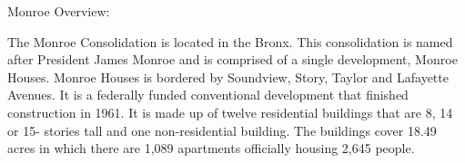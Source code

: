 Monroe Overview:    

  

The Monroe Consolidation is located in the Bronx. This consolidation is named after President James Monroe and is comprised of a single development, Monroe Houses. Monroe Houses is bordered by Soundview, Story, Taylor and Lafayette Avenues. It is a federally funded conventional development that finished construction in 1961. It is made up of twelve residential buildings that are 8, 14 or 15- stories tall and one non-residential building. The buildings cover 18.49 acres in which there are 1,089 apartments officially housing 2,645 people.